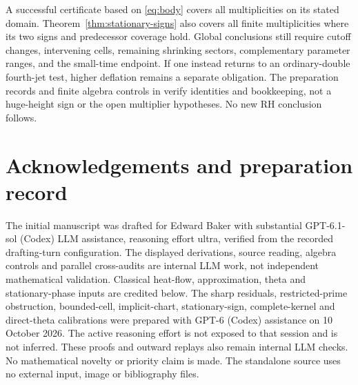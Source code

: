 \documentclass[11pt]{article}
\theoremstyle{definition}
\theoremstyle{remark}
\begin{document}
A successful certificate based on \eqref{eq:body} covers all multiplicities
on its stated domain. Theorem~\ref{thm:stationary-signs} also covers all
finite multiplicities where its two signs and predecessor coverage hold.
Global conclusions still require cutoff changes,
intervening cells, remaining shrinking sectors, complementary parameter
ranges, and the small-time endpoint. If one instead returns to an
ordinary-double fourth-jet test, higher deflation remains a separate
obligation. The preparation records and finite algebra controls in
\cite{heat25} verify identities and bookkeeping, not a huge-height sign
or the open multiplier hypotheses. No new RH conclusion follows.

\section*{Acknowledgements and preparation record}

The initial manuscript was drafted for Edward Baker with substantial
GPT-6.1-sol (Codex) LLM assistance, reasoning effort ultra, verified from
the recorded drafting-turn configuration. The displayed derivations,
source reading, algebra controls and parallel cross-audits are internal
LLM work, not independent mathematical validation. Classical heat-flow,
approximation, theta and stationary-phase inputs are credited below.
The sharp residuals, restricted-prime obstruction, bounded-cell,
implicit-chart, stationary-sign, complete-kernel and direct-theta
calibrations were prepared with
GPT-6 (Codex) assistance on 10 October
2026. The active reasoning effort is not exposed to that session and is
not inferred. These proofs and outward replays also remain internal LLM
checks. No mathematical novelty or priority claim is made. The standalone source
uses no external input, image or bibliography files.
\end{document}
